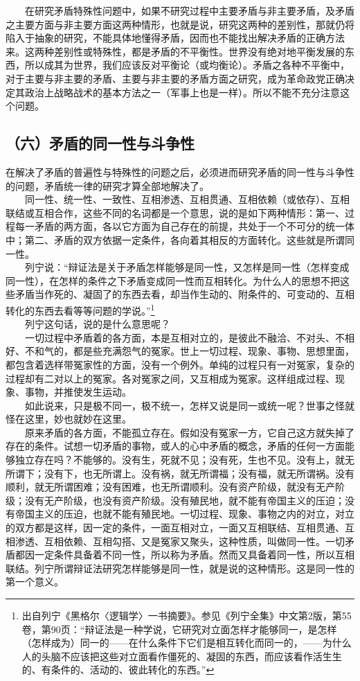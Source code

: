 \documentclass[cn,11pt,chinese]{elegantbook}
\def\myformat#1{\hfil\hfil #1}
\begin{document}
　　在研究矛盾特殊性问题中，如果不研究过程中主要矛盾与非主要矛盾，及矛盾之主要方面与非主要方面这两种情形，也就是说，研究这两种的差别性，那就仍将陷入于抽象的研究，不能具体地懂得矛盾，因而也不能找出解决矛盾的正确方法来。这两种差别性或特殊性，都是矛盾的不平衡性。世界没有绝对地平衡发展的东西，所以成其为世界，我们应该反对平衡论（或均衡论）。矛盾之各种不平衡中，对于主要与非主要的矛盾、主要与非主要的矛盾方面之研究，成为革命政党正确决定其政治上战略战术的基本方法之一（军事上也是一样）。所以不能不充分注意这个问题。\\
\subsection*{\myformat{（六）矛盾的同一性与斗争性}}
在解决了矛盾的普遍性与特殊性的问题之后，必须进而研究矛盾的同一性与斗争性的问题，矛盾统一律的研究才算全部地解决了。\\
　　同一性、统一性、一致性、互相渗透、互相贯通、互相依赖（或依存）、互相联结或互相合作，这些不同的名词都是一个意思，说的是如下两种情形：第一、过程每一矛盾的两方面，各以它方面为自己存在的前提，共处于一个不可分的统一体中；第二、矛盾的双方依据一定条件，各向着其相反的方面转化。这些就是所谓同一性。\\
　　列宁说：“辩证法是关于矛盾怎样能够是同一性，又怎样是同一性（怎样变成同一性），在怎样的条件之下矛盾变成同一性而互相转化。为什么人的思想不把这些矛盾当作死的、凝固了的东西去看，却当作生动的、附条件的、可变动的、互相转化的东西去看等等问题的学说。”\footnote[10]{ 出自列宁《黑格尔〈逻辑学〉一书摘要》。参见《列宁全集》中文第2版，第55卷，第90页：“辩证法是一种学说，它研究对立面怎样才能够同一，是怎样（怎样成为）同一的——在什么条件下它们是相互转化而同一的，——为什么人的头脑不应该把这些对立面看作僵死的、凝固的东西，而应该看作活生生的、有条件的、活动的、彼此转化的东西。”}\\
　　列宁这句话，说的是什么意思呢？\\
　　一切过程中矛盾着的各方面，本是互相对立的，是彼此不融洽、不对头、不相好、不和气的，都是些充满怨气的冤家。世上一切过程、现象、事物、思想里面，都包含着选样带冤家性的方面，没有一个例外。单纯的过程只有一对冤家，复杂的过程却有二对以上的冤家。各对冤家之间，又互相成为冤家。这样组成过程、现象、事物，并推使发生运动。\\
　　如此说来，只是极不同一，极不统一，怎样又说是同一或统一呢？世事之怪就怪在这里，妙也就妙在这里。\\
　　原来矛盾的各方面，不能孤立存在。假如没有冤家一方，它自己这方就失掉了存在的条件。试想一切矛盾的事物，或人的心中矛盾的概念，矛盾的任何一方面能够独立存在吗？不能够的。没有生，死就不见；没有死，生也不见。没有上，就无所谓下；没有下，也无所谓上。没有祸，就无所谓福；没有福，就无所谓祸。没有顺利，就无所谓困难；没有困难，也无所谓顺利。没有资产阶级，就没有无产阶级；没有无产阶级，也没有资产阶级。没有殖民地，就不能有帝国主义的压迫；没有帝国主义的压迫，也就不能有殖民地。一切过程、现象、事物之内的对立，对立的双方都是这样，因一定的条件，一面互相对立，一面又互相联结、互相贯通、互相渗透、互相依赖、互相勾搭、又是冤家又聚头，这种性质，叫做同一性。一切矛盾都因一定条件具备着不同一性，所以称为矛盾。然而又具备着同一性，所以互相联结。列宁所谓辩证法研究怎样能够是同一性，就是说的这种情形。这是同一性的第一个意义。\\
\end{document}
